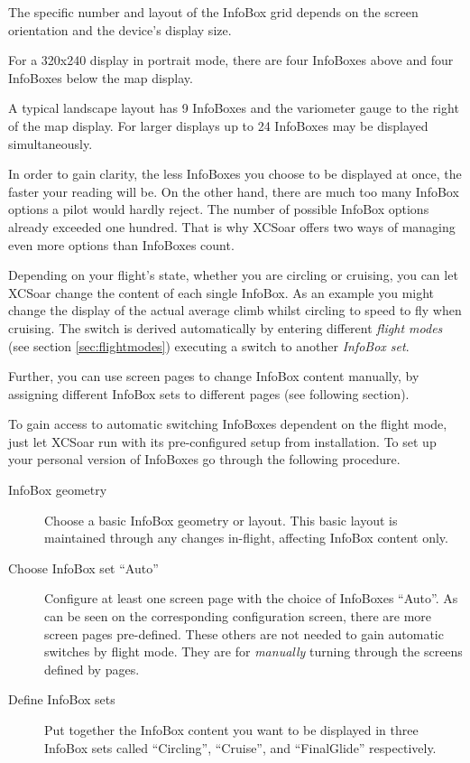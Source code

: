 The specific number and layout of the InfoBox grid depends on the
screen orientation and the device's display size.  

For a 320x240 display in portrait mode, there are four InfoBoxes above
and four InfoBoxes below the map display.

A typical landscape layout has 9 InfoBoxes and the variometer gauge 
to the right of the map display. 
For larger displays up to 24 InfoBoxes may be displayed simultaneously.  

In order to gain clarity, the less InfoBoxes you choose to be displayed at once,
the faster your reading will be. On the other hand, there are much too many 
InfoBox options a pilot would hardly reject. The number of possible InfoBox 
options already exceeded one hundred. That is why XCSoar offers two ways of 
managing even more options than InfoBoxes count.

Depending on your flight's state, whether you are circling or cruising, you can 
let XCSoar change the content of each single InfoBox. As an example you might 
change the display of the actual average climb whilst circling to speed to fly 
when cruising. The switch is derived automatically by entering different 
\emph{flight modes} (see section \ref{sec:flightmodes}) executing a switch to 
another \emph{InfoBox set}.

Further, you can use screen pages to change InfoBox content manually, by 
assigning different InfoBox sets to different pages (see following section).

To gain access to automatic switching InfoBoxes dependent on the flight mode, 
just let XCSoar run with its pre-configured setup from installation. To set up 
your personal version of InfoBoxes go through the following procedure.
\begin{description}
\item[InfoBox geometry] Choose a basic InfoBox geometry or layout.  This basic
layout is maintained through any changes in-flight, affecting InfoBox content 
only.
\item[Choose InfoBox set ``Auto''] Configure at least one screen page with the
choice of InfoBoxes ``Auto''. As can be seen on the corresponding configuration
screen, there are more screen pages pre-defined.   These 
others are not needed to gain automatic switches by flight mode. They are for \emph{manually} turning through the screens defined by pages. 
\item[Define InfoBox sets] Put together the InfoBox content you want to be
displayed in three InfoBox sets called ``Circling'', ``Cruise'', and ``FinalGlide''
respectively.
\end{description}  


